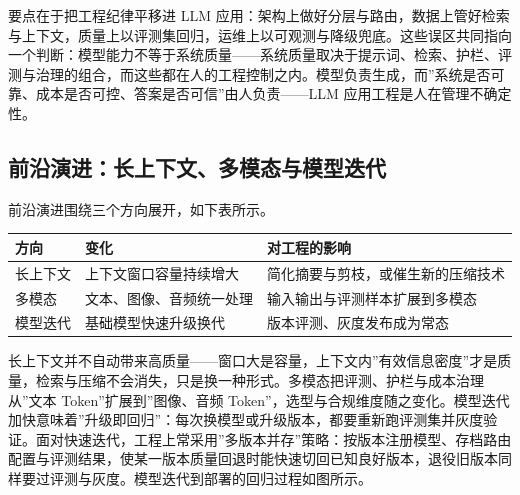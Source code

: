 \documentclass[12pt,a4paper,twoside,openany]{ctexbook}
\numberwithin{figure}{chapter}
\numberwithin{table}{chapter}
\newcounter{none}
\begin{document}
要点在于把工程纪律平移进 LLM
应用：架构上做好分层与路由，数据上管好检索与上下文，质量上以评测集回归，运维上以可观测与降级兜底。这些误区共同指向一个判断：模型能力不等于系统质量------系统质量取决于提示词、检索、护栏、评测与治理的组合，而这些都在人的工程控制之内。模型负责生成，而''系统是否可靠、成本是否可控、答案是否可信''由人负责------LLM
应用工程是人在管理不确定性。

\subsection{前沿演进：长上下文、多模态与模型迭代}\label{ux524dux6cbfux6f14ux8fdbux957fux4e0aux4e0bux6587ux591aux6a21ux6001ux4e0eux6a21ux578bux8fedux4ee3}

前沿演进围绕三个方向展开，如下表所示。

{\def\LTcaptype{none} %
\begin{longtable}[]{@{}
  >{\raggedright\arraybackslash}p{}
  >{\raggedright\arraybackslash}p{}
  >{\raggedright\arraybackslash}p{}@{}}
\toprule\noalign{}
\begin{minipage}[b]{\linewidth}\raggedright
方向
\end{minipage} & \begin{minipage}[b]{\linewidth}\raggedright
变化
\end{minipage} & \begin{minipage}[b]{\linewidth}\raggedright
对工程的影响
\end{minipage} \\
\midrule\noalign{}
\endhead
\bottomrule\noalign{}
\endlastfoot
长上下文 & 上下文窗口容量持续增大 &
简化摘要与剪枝，或催生新的压缩技术 \\
多模态 & 文本、图像、音频统一处理 & 输入输出与评测样本扩展到多模态 \\
模型迭代 & 基础模型快速升级换代 & 版本评测、灰度发布成为常态 \\
\end{longtable}
}

长上下文并不自动带来高质量------窗口大是容量，上下文内''有效信息密度''才是质量，检索与压缩不会消失，只是换一种形式。多模态把评测、护栏与成本治理从''文本
Token''扩展到''图像、音频
Token''，选型与合规维度随之变化。模型迭代加快意味着''升级即回归''：每次换模型或升级版本，都要重新跑评测集并灰度验证。面对快速迭代，工程上常采用''多版本并存''策略：按版本注册模型、存档路由配置与评测结果，使某一版本质量回退时能快速切回已知良好版本，退役旧版本同样要过评测与灰度。模型迭代到部署的回归过程如图所示。
\end{document}
